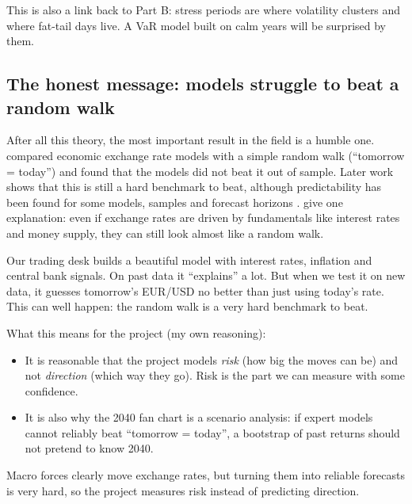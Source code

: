 \documentclass[11pt,a4paper]{article}
\begin{document}
This is also a link back to Part B: stress periods are where volatility
clusters and where fat-tail days live. A VaR model built on calm years will
be surprised by them.

\subsection{The honest message: models struggle to beat a random walk}

After all this theory, the most important result in the field is a humble
one. \citet{meese1983} compared economic exchange rate models with a simple
random walk (``tomorrow = today'') and found that the models did not beat
it out of sample. Later work shows that this is still a hard benchmark to
beat, although predictability has been found for some models, samples and
forecast horizons \citep{rossi2013,molodtsovapapell2009}. \citet{engelwest2005} give one explanation: even if
exchange rates are driven by fundamentals like interest rates and money
supply, they can still look almost like a random walk.

\begin{fictive}
Our trading desk builds a beautiful model with interest rates, inflation and
central bank signals. On past data it ``explains'' a lot. But when we test
it on new data, it guesses tomorrow's EUR/USD no better than just using
today's rate. This can well happen: the random walk is a very hard
benchmark to beat.
\end{fictive}

What this means for the project (my own reasoning):
\begin{itemize}
  \item It is reasonable that the project models \emph{risk} (how big the
    moves can be) and not \emph{direction} (which way they go). Risk is
    the part we can measure with some confidence.
  \item It is also why the 2040 fan chart is a scenario analysis: if expert
    models cannot reliably beat ``tomorrow = today'', a bootstrap of past
    returns should not pretend to know 2040.
\end{itemize}

\begin{onesentence}
Macro forces clearly move exchange rates, but turning them into reliable
forecasts is very hard, so the project measures risk instead of predicting
direction.
\end{onesentence}

\end{document}

